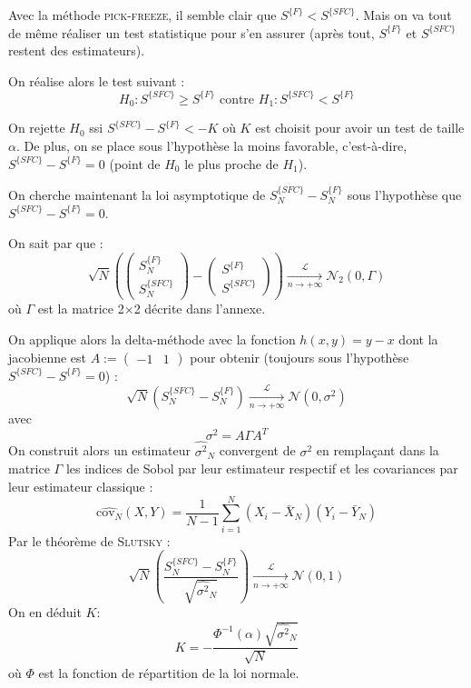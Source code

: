 \documentclass{article}
\begin{document}
Avec la méthode \textsc{pick-freeze}, il semble clair que $S^{\{F\}} < S^{\{SFC\}}$. Mais on va tout de même réaliser un test statistique pour s'en assurer (après tout, $S^{\{F\}}$ et $S^{\{SFC\}}$ restent des estimateurs).

On réalise alors le test suivant :
\[H_{0} : S^{\{SFC\}} \ge S^{\{F\}} \text{ contre } H_{1} : S^{\{SFC\}} < S^{\{F\}}\]

On rejette $H_0$ ssi $S^{\{SFC\}} - S^{\{F\}} < -K$ où $K$ est choisit pour avoir un test de taille $\alpha$. De plus, on se place sous l'hypothèse la moins favorable, c'est-à-dire, $S^{\{SFC\}} - S^{\{F\}} = 0$ (point de $H_0$ le plus proche de $H_1$).

On cherche maintenant la loi asymptotique de $S^{\{SFC\}}_N - S^{\{F\}}_N$ sous l'hypothèse que $S^{\{SFC\}} - S^{\{F\}} = 0$.

On sait par \cite{ref2} que : 
\[\sqrt{N}\left(\begin{pmatrix}S^{\{F\}}_N\\S^{\{SFC\}}_N\end{pmatrix} - \begin{pmatrix}S^{\{F\}}\\S^{\{SFC\}}\end{pmatrix}\right)\xrightarrow[\text{$n\to+\infty$}]{\mathcal{L}}\mathcal{N}_{2}(0,\Gamma)\]
où $\Gamma$ est la matrice 2$\times$2 décrite dans l'annexe.

On applique alors la delta-méthode avec la fonction $h(x,y)=y-x$ dont la jacobienne est $A := \begin{pmatrix}-1 & 1\end{pmatrix}$ pour obtenir (toujours sous l'hypothèse $S^{\{SFC\}} - S^{\{F\}} = 0$) :
\[\sqrt{N}\left(S^{\{SFC\}}_N - S^{\{F\}}_N\right)\xrightarrow[\text{$n\to+\infty$}]{\mathcal{L}}\mathcal{N}(0,\sigma^{2})\]
avec 
\[\sigma^{2}=A\Gamma A^{T}\]
On construit alors un estimateur $\widehat{\sigma^{2}}_N$ convergent de $\sigma^{2}$ en remplaçant dans la matrice $\Gamma$ les indices de Sobol par leur estimateur respectif et les covariances par leur estimateur classique :
\[\widehat{\text{cov}_N}(X, Y) = \frac{1}{N-1}\sum_{i=1}^N (X_i - \bar{X}_N)(Y_i - \bar{Y}_N)\]
Par le théorème de \textsc{Slutsky} : 
\[\sqrt{N}\left(\frac{S^{\{SFC\}}_N- S^{\{F\}}_N}{\sqrt{\widehat{\sigma^{2}}_N}}\right)\xrightarrow[\text{$n\to+\infty$}]{\mathcal{L}}\mathcal{N}(0,1)\]
On en déduit $K$:
\[K=-\frac{\Phi^{-1}(\alpha)\sqrt{\widehat{\sigma^{2}}_N}}{\sqrt{N}}\]
où $\Phi$ est la fonction de répartition de la loi normale.
\end{document}
